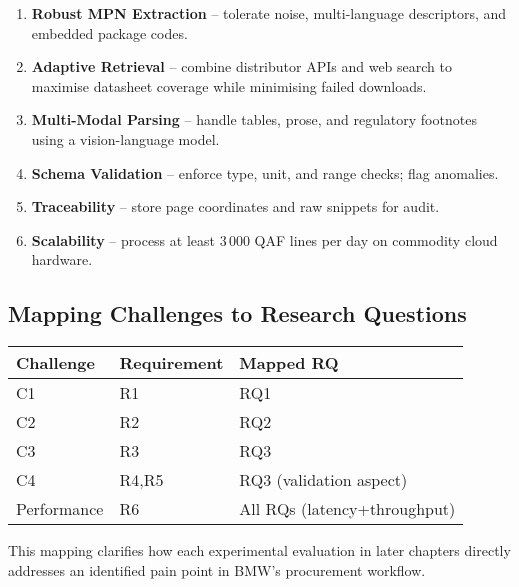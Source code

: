 \begin{enumerate}[label=R\arabic*]
  \item \textbf{Robust MPN Extraction} – tolerate noise, multi-language descriptors, and embedded package codes.  
  \item \textbf{Adaptive Retrieval} – combine distributor APIs and web search to maximise datasheet coverage while minimising failed downloads.  
  \item \textbf{Multi-Modal Parsing} – handle tables, prose, and regulatory footnotes using a vision-language model.  
  \item \textbf{Schema Validation} – enforce type, unit, and range checks; flag anomalies.  
  \item \textbf{Traceability} – store page coordinates and raw snippets for audit.  
  \item \textbf{Scalability} – process at least 3\,000 QAF lines per day on commodity cloud hardware.  
\end{enumerate}


\subsection{Mapping Challenges to Research Questions}
\begin{center}
\begin{tabular}{lll}
\textbf{Challenge} & \textbf{Requirement} & \textbf{Mapped RQ} \\\hline
C1 & R1 & RQ1 \\
C2 & R2 & RQ2 \\
C3 & R3 & RQ3 \\
C4 & R4,\;R5 & RQ3 (validation aspect) \\
Performance & R6 & All RQs (latency+throughput) \\
\end{tabular}
\end{center}


This mapping clarifies how each experimental evaluation in later chapters directly addresses an identified pain point in BMW’s procurement workflow.
